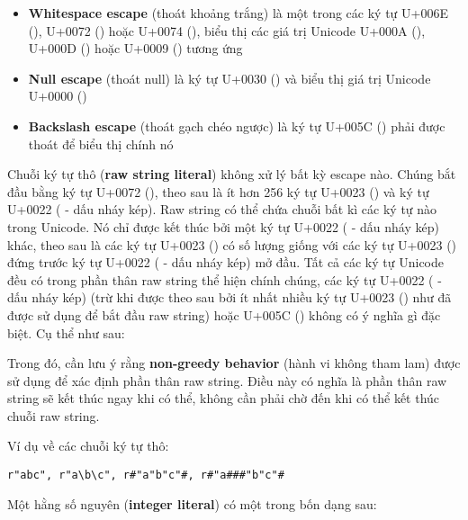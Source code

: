     \begin{itemize}
    \item{\textbf{Whitespace escape} (thoát khoảng trắng) là một trong các ký tự U+006E (), U+0072 () hoặc U+0074 (), biểu thị các giá trị Unicode U+000A (), U+000D () hoặc U+0009 () tương ứng}
    \item{\textbf{Null escape} (thoát null) là ký tự U+0030 () và biểu thị giá trị Unicode U+0000 ()}
    \item{\textbf{Backslash escape} (thoát gạch chéo ngược) là ký tự U+005C (\kw{\textbackslash}) phải được thoát để biểu thị chính nó}
    \end{itemize}

    Chuỗi ký tự thô (\textbf{raw string literal}) không xử lý bất kỳ escape nào. Chúng bắt đầu bằng ký tự U+0072 (), theo sau là ít hơn 256 ký tự U+0023 (\kw{\#}) và ký tự U+0022 ( - dấu nháy kép). Raw string có thể chứa chuỗi bất kì các ký tự nào trong Unicode. Nó chỉ được kết thúc bởi một ký tự U+0022 ( - dấu nháy kép) khác, theo sau là các ký tự U+0023 (\kw{\#}) có số lượng giống với các ký tự U+0023 (\kw{\#}) đứng trước ký tự U+0022 ( - dấu nháy kép) mở đầu. Tất cả các ký tự Unicode đều có trong phần thân raw string thể hiện chính chúng, các ký tự U+0022 ( - dấu nháy kép) (trừ khi được theo sau bởi ít nhất nhiều ký tự U+0023 (\kw{\#}) như đã được sử dụng để bắt đầu raw string) hoặc U+005C (\kw{\textbackslash}) không có ý nghĩa gì đặc biệt. Cụ thể như sau:

    \regexrawstringliteral

\noindent Trong đó, cần lưu ý rằng \textbf{non-greedy behavior} (hành vi không tham lam) được sử dụng để xác định phần thân raw string. Điều này có nghĩa là phần thân raw string sẽ kết thúc ngay khi có thể, không cần phải chờ đến khi có thể kết thúc chuỗi raw string.

\noindent Ví dụ về các chuỗi ký tự thô:
\begin{lstlisting}[]
r"abc", r"a\b\c", r#"a"b"c"#, r#"a###"b"c"#
\end{lstlisting}

    Một hằng số nguyên (\textbf{integer literal}) có một trong bốn dạng sau:

